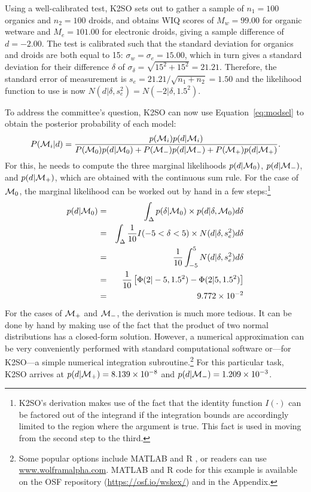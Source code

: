 Using a well-calibrated test, K2SO sets out to gather a sample of $n_1 = 100$ organics and $n_2 = 100$ droids, and obtains WIQ scores of $M_w = 99.00$ for organic wetware and $M_e = 101.00$ for electronic droids, giving a sample difference of $d = -2.00$. The test is calibrated such that the standard deviation for organics and droids are both equal to 15: $\sigma_w = \sigma_e = 15.00$, which in turn gives a standard deviation for their difference $\delta$ of $\sigma_\delta = \sqrt{15^2+15^2} = 21.21$. Therefore, the standard error of measurement is $s_e = 21.21/\sqrt{n_1+n_2}=1.50$ and the likelihood function to use is now $N\left(d|\delta,s_e^2\right) = N\left(-2|\delta,1.5^2\right)$.

To address the committee's question, K2SO can now use Equation~\ref{eq:modsel} to obtain the posterior probability of each model: $$P({\cal M}_i|d) = \frac{p({\cal M}_i)p(d|{\cal M}_i)}{P({\cal M}_0)p(d|{\cal M}_0) + P({\cal M}_-)p(d|{\cal M}_-) + P({\cal M}_+)p(d|{\cal M}_+)}.$$
For this, he needs to compute the three marginal likelihoods $p(d|{\cal M}_0)$, $p(d|{\cal M}_-)$, and $p(d|{\cal M}_+)$, which are obtained with the continuous sum rule. For the case of ${\cal M}_0$, the marginal likelihood can be worked out by hand in a few steps:\footnote{K2SO's derivation makes use of the fact that the identity function $I(\cdot)$ can be factored out of the integrand if the integration bounds are accordingly limited to the region where the argument is true. This fact is used in moving from the second step to the third.}
\begin{eqnarray*}
  p(d|{\cal M}_0) &=& \int_\Delta p(\delta|{\cal M}_0)\times p(d|\delta,{\cal M}_0) d\delta\\
            &=& \int_\Delta\frac{1}{10}I(-5<\delta<5) \times N(d|\delta,s_e^2)  d\delta\\
            &=& \frac{1}{10} \int_{-5}^{5} N(d|\delta,s_e^2) d\delta\\
            &=& \frac{1}{10} \left[ \Phi(2|-5,1.5^2) - \Phi(2|5,1.5^2) \right]\\ 
            &=& 9.772 \times 10^{-2}
\end{eqnarray*}
For the cases of ${\cal M}_+$ and ${\cal M}_-$, the derivation is much more tedious. It can be done by hand by making use of the fact that the product of two normal distributions has a closed-form solution. However, a numerical approximation can be very conveniently performed with standard computational software or---for K2SO---a simple numerical integration subroutine.\footnote{Some popular options include MATLAB \protect\cite{MATLAB} and R \cite{R}, or readers can use \url{www.wolframalpha.com}. MATLAB and R code for this example is available on the OSF repository {(\url{https://osf.io/wskex/})} and in the Appendix.} For this particular task, K2SO arrives at $p(d|{\cal M}_+) = 8.139 \times 10^{-8}$ and $p(d|{\cal M}_-) = 1.209 \times 10^{-3}$.

